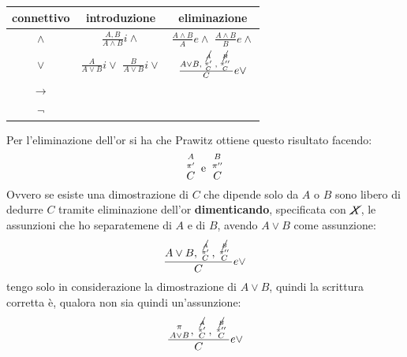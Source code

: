 \documentclass[a4paper,12pt, oneside]{book}
\newcommand*{\bfrac}[2]{\genfrac{}{}{0pt}{}{#1}{#2}}
\begin{document}
\begin{table}[H]
  \Large
  \centering
  \begin{tabular}{c||c|c}
    connettivo& introduzione & eliminazione\\
    \hline
    \hline
    $\land$ & $\frac{A,B}{A\land B}i\land$&$\frac{A\land B}{A}e\land$
                                            $\frac{A\land B}{B}e\land$\\
    \hline
    $\lor$ &$\frac{A}{A\lor B}i\lor$
             $\frac{B}{A\lor B}i\lor$&$\frac{A\lor B,
                                       \bfrac{\bfrac{\cancel{A}}{\pi'}}{C},
                                       \bfrac{\bfrac{\cancel{B}}{\pi''}}{C}}{C}
                                       e\lor$\\
    \hline
    $\to$ & &\\
    \hline
    $\neg$ & &\\
    \hline
  \end{tabular}
\end{table}
Per l'eliminazione dell'or si ha che Prawitz ottiene questo risultato facendo:
\[\bfrac{\bfrac{A}{\pi'}}{C}\mbox{ e }\bfrac{\bfrac{B}{\pi''}}{C}\]
Ovvero se esiste una dimostrazione di $C$ che dipende solo da $A$ o $B$ sono
libero di dedurre $C$ tramite eliminazione dell'or \textbf{dimenticando},
specificata con $\cancel{X}$, le
assunzioni che ho separatemene di $A$ e di $B$, avendo $A\lor B$ come
assunzione: 
\[\frac{A\lor B,\bfrac{\bfrac{\cancel{A}}{\pi'}}{C},
    \bfrac{\bfrac{\cancel{B}}{\pi''}}{C}}{C}e\lor\]
tengo solo in considerazione la dimostrazione di $A\lor B$, quindi la scrittura
corretta è, qualora non sia quindi un'assunzione:
\[\frac{\bfrac{\pi}{A\lor B},\bfrac{\bfrac{\cancel{A}}{\pi'}}{C},
    \bfrac{\bfrac{\cancel{B}}{\pi''}}{C}}{C}e\lor\]
\end{document}
